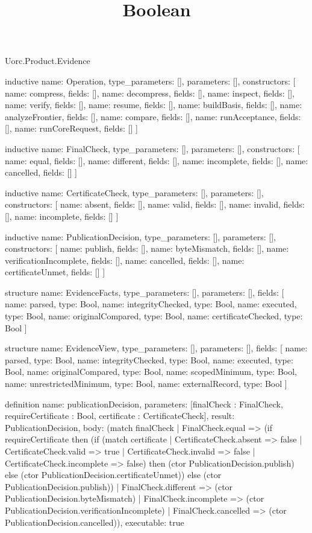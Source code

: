 \begin{lexlean}{Uorc.Product.Evidence}
\title{Boolean}
\begin{semanticmodule}
inductive{
  name: Operation,
  type_parameters: [],
  parameters: [],
  constructors: [
    {name: compress, fields: []},
    {name: decompress, fields: []},
    {name: inspect, fields: []},
    {name: verify, fields: []},
    {name: resume, fields: []},
    {name: buildBasis, fields: []},
    {name: analyzeFrontier, fields: []},
    {name: compare, fields: []},
    {name: runAcceptance, fields: []},
    {name: runCoreRequest, fields: []}
  ]
}

inductive{
  name: FinalCheck,
  type_parameters: [],
  parameters: [],
  constructors: [
    {name: equal, fields: []},
    {name: different, fields: []},
    {name: incomplete, fields: []},
    {name: cancelled, fields: []}
  ]
}

inductive{
  name: CertificateCheck,
  type_parameters: [],
  parameters: [],
  constructors: [
    {name: absent, fields: []},
    {name: valid, fields: []},
    {name: invalid, fields: []},
    {name: incomplete, fields: []}
  ]
}

inductive{
  name: PublicationDecision,
  type_parameters: [],
  parameters: [],
  constructors: [
    {name: publish, fields: []},
    {name: byteMismatch, fields: []},
    {name: verificationIncomplete, fields: []},
    {name: cancelled, fields: []},
    {name: certificateUnmet, fields: []}
  ]
}

structure{
  name: EvidenceFacts,
  type_parameters: [],
  parameters: [],
  fields: [
    {name: parsed, type: Bool},
    {name: integrityChecked, type: Bool},
    {name: executed, type: Bool},
    {name: originalCompared, type: Bool},
    {name: certificateChecked, type: Bool}
  ]
}

structure{
  name: EvidenceView,
  type_parameters: [],
  parameters: [],
  fields: [
    {name: parsed, type: Bool},
    {name: integrityChecked, type: Bool},
    {name: executed, type: Bool},
    {name: originalCompared, type: Bool},
    {name: scopedMinimum, type: Bool},
    {name: unrestrictedMinimum, type: Bool},
    {name: externalRecord, type: Bool}
  ]
}

definition{
  name: publicationDecision,
  parameters: [finalCheck : FinalCheck, requireCertificate : Bool, certificate : CertificateCheck],
  result: PublicationDecision,
  body: (match finalCheck
    | FinalCheck.equal => (if requireCertificate then (if (match certificate
      | CertificateCheck.absent => false
      | CertificateCheck.valid => true
      | CertificateCheck.invalid => false
      | CertificateCheck.incomplete => false) then (ctor PublicationDecision.publish) else (ctor PublicationDecision.certificateUnmet)) else (ctor PublicationDecision.publish))
    | FinalCheck.different => (ctor PublicationDecision.byteMismatch)
    | FinalCheck.incomplete => (ctor PublicationDecision.verificationIncomplete)
    | FinalCheck.cancelled => (ctor PublicationDecision.cancelled)),
  executable: true
}


\end{semanticmodule}
\end{lexlean}

